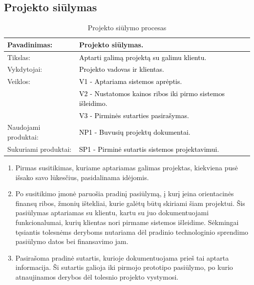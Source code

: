 \documentclass{VUMIFPSkursinis}
\begin{document}
	\newpage

	\subsection{Projekto siūlymas}
	\begin{center}
		\begin{table}[ht]
			\caption{Projekto siūlymo procesas}
			\begin{tabular}{ | l | l | }
				\hline
				Pavadinimas:          & Projekto siūlymas.						\\ \hline
				Tikslas:              & \textcolor{black}{Aptarti galimą projektą su galimu klientu.}			\\ \hline
				Vykdytojai:           & \textcolor{black}{Projekto vadovas ir klientas.}					\\ \hline
				Veiklos:              & \textcolor{black}{V1 - Aptariama sistemos aprėptis. }				\\
				                      & \textcolor{black}{V2 - Nustatomos kainos ribos iki pirmo sistemos išleidimo.}	\\
				                      & \textcolor{black}{V3 - Pirminės sutarties pasirašymas.}				\\ \hline
				Naudojami produktai:	& \textcolor{black}{NP1 - Buvusių projektų dokumentai. }				\\ \hline
				Sukuriami produktai:	& \textcolor{black}{SP1 - Pirminė sutartis sistemos projektavimui.	}	\\ \hline
			\end{tabular}
		\end{table}
	\end{center}

	\begin{enumerate}
		\item{
			Pirmas susitikimas, kuriame aptariamas galimas projektas, kiekviena pusė išsako savo lūkesčius, pasidalinama idėjomis.
		}
		\item{
			Po susitikimo įmonė paruošia pradinį pasiūlymą, į kurį įeina orientacinės finansų ribos, žmonių ištekliai, kurie galėtų būtų skiriami šiam projektui.
			Šis pasiūlymas aptariamas su klientu, kartu su juo dokumentuojami funkcionalumai, kurių klientas nori pirmame sistemos išleidime.
			Sėkmingai tęsiantis tolesnėms deryboms nutariama dėl pradinio technologinio sprendimo pasiūlymo datos bei finansavimo jam.
		}
		\item{
			Pasirašoma pradinė sutartis, kurioje dokumentuojama prieš tai aptarta informacija.
			Ši sutartis galioja iki pirmojo prototipo pasiūlymo, po kurio atnaujinamos derybos dėl tolesnio projekto vystymosi.
		}
	\end{enumerate}
\end{document}
